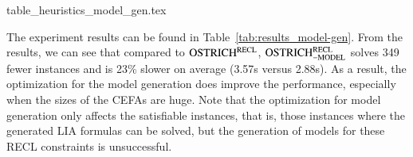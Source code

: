 \begin{table}[htbp]
  {table_heuristics_model_gen.tex}
  \caption{Evaluation of the optimizations for the model generation in Section~\ref{sec-opt-sol-gen}}\label{tab:results_model-gen}
\end{table}

The experiment results can be found in Table~\ref{tab:results_model-gen}. From the results, we can see that compared to $\rm OSTRICH^{RECL}$, $\rm OSTRICH^{RECL}_{\rm -MODEL}$ solves 349 fewer instances and is 23\% slower on average (3.57s versus 2.88s). As a result, the optimization for the model generation does improve the performance, especially when the sizes of the CEFAs are huge.  
Note that the optimization for model generation only affects the satisfiable instances, that is, those instances where the generated LIA formulas can be solved, but the generation of models for these RECL constraints is unsuccessful. 


